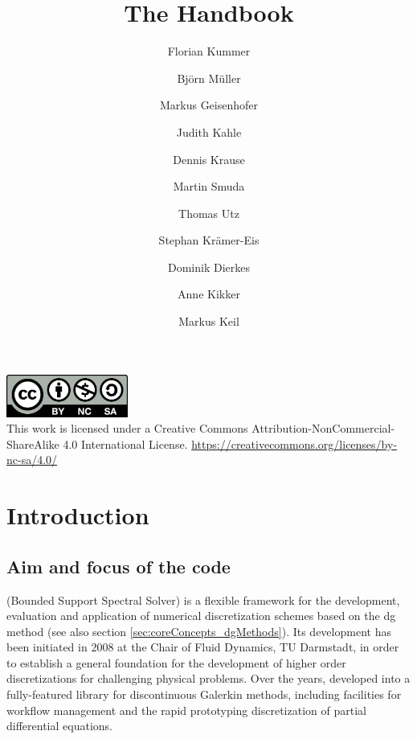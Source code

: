 \documentclass[a4paper,10pt]{report} %
\title{The \BoSSS{} Handbook}
\author{
Florian Kummer \and
Björn Müller \and
Markus Geisenhofer \and
Judith Kahle \and %
Dennis Krause \and
Martin Smuda \and
Thomas Utz  \and
Stephan Krämer-Eis \and
Dominik Dierkes \and
Anne Kikker \and
Markus Keil %
}
\begin{document}
\maketitle
\clearpage
\vfill


\includegraphics[width=4cm]{by-nc-sa}\\

This work is licensed under a Creative Commons Attribution-NonCommercial-ShareAlike 4.0 International License. 
\url{https://creativecommons.org/licenses/by-nc-sa/4.0/}

\clearpage

\tableofcontents


\part{Introduction}
\label{sec:introduction}


\chapter{Aim and focus of the \BoSSS{} code}

\BoSSS{} (Bounded Support Spectral Solver) is a flexible framework for the 
development, evaluation and application of numerical discretization schemes based on the 
\ac{dg}  method (see also section \ref{sec:coreConcepts_dgMethods}). 
Its development has been initiated in 2008 at the Chair of Fluid Dynamics, TU Darmstadt, in
order to establish a general foundation for the development of higher order discretizations for 
challenging physical problems.
Over the years,
\BoSSS{} developed into a fully-featured library for discontinuous Galerkin methods, including facilities for
workflow management and the rapid prototyping discretization of partial differential equations.
\end{document}
